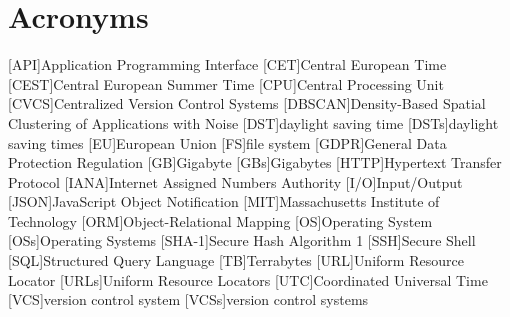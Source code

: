 \chapter*{Acronyms}
\begin{acronym}
    [API]{Application Programming Interface}
    [CET]{Central European Time}
    [CEST]{Central European Summer Time}
    [CPU]{Central Processing Unit}
    [CVCS]{Centralized Version Control Systems}
    [DBSCAN]{Density-Based Spatial Clustering of Applications with Noise}
    [DST]{daylight saving time}
    [DSTs]{daylight saving times}
    [EU]{European Union}
    [FS]{file system}
    [GDPR]{General Data Protection Regulation}
    [GB]{Gigabyte}
    [GBs]{Gigabytes}
    [HTTP]{Hypertext Transfer Protocol}
    [IANA]{Internet Assigned Numbers Authority}
    [I/O]{Input/Output}
    [JSON]{JavaScript Object Notification}
    [MIT]{Massachusetts Institute of Technology}
    [ORM]{Object-Relational Mapping}
    [OS]{Operating System}
    [OSs]{Operating Systems}
    [SHA-1]{Secure Hash Algorithm 1}
    [SSH]{Secure Shell}
    [SQL]{Structured Query Language}
    [TB]{Terrabytes}
    [URL]{Uniform Resource Locator}
    [URLs]{Uniform Resource Locators}
    [UTC]{Coordinated Universal Time}
    [VCS]{version control system}
    [VCSs]{version control systems}
\end{acronym}
